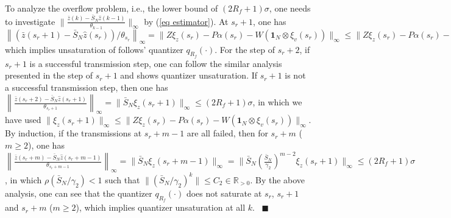 \documentclass{autart}
\def\qedp{\hspace*{\fill}~{\tiny $\blacksquare$}}
\def\qedp{\hspace*{\fill}~{\tiny $\blacksquare$}}
\begin{document}


To analyze the overflow problem, i.e., the lower bound of $(2R_f +1) \sigma$, one needs to investigate $\|\frac{\bar z(k) - \bar S_N \hat z(k-1)}{\theta_{k-1}}\|_\infty$ by (\ref{eq estimator}). At $s_r + 1$, one has 
$
\left\|(\bar z(s_r + 1) - \bar S_N \hat z(s_r))/\theta_{s_r}\right\|_\infty 
=\| Z \xi_z(s_r)  -  P \alpha(s_r)   - W (\mathbf 1_N \otimes \xi_v(s_r)) \|_\infty 
 \le \| Z \xi_z(s_r)  -  P \alpha(s_r)   - W (\mathbf 1_N \otimes \xi_v(s_r)) \|  
\le (2R_f+1)\sigma
$
which implies unsaturation of follows' quantizer $q_{R_f}(\cdot)$. 
For the step of $s_r + 2$, if $s_r+1$ is a successful transmission step, one can follow the similar analysis presented in the step of $s_r + 1$ and shows quantizer unsaturation. If $s_r+1$ is not a successful transmission step, then one has 
$
\left\| \frac{\bar z(s_r + 2) - \bar S_N \hat z(s_r+1)}{\theta_{s_r+1}}\right\|_\infty 
=\| \bar S _N \xi_z (s_r+1) \|_\infty \le (2R_f+1)\sigma
$,
in which we have used $\|\xi_z(s_r + 1 )\|_\infty \le \| Z \xi_z(s_r)  -  P \alpha(s_r)   - W (\mathbf 1_N \otimes \xi_v(s_r)) \|_\infty $. By induction, if the transmissions at $s_r + m-1$ are all failed, then for $s_r + m$ ($m\ge2$), one has 
$
\left\|\frac{\bar z(s_r + m) - \bar S_N \hat z(s_r+m-1)}{\theta_{s_r+m-1}}\right\|_\infty 
=\| \bar S _N \xi_z (s_r + m-1) \|_\infty 
=\| \bar S _N \left(\frac{\bar S_N}{\gamma_2}\right)^{m-2} \xi_z (s_r +1) \|_\infty  \le (2R_f+1)\sigma
$,
in which $\rho( \bar S_N/\gamma_2)< 1$ such that $\|(\bar S_N /\gamma_2)^{k}\| \le C_2 \in \mathbb R _{>0}$. By the above analysis, one can see that the quantizer $q_{R_f}(\cdot)$ does not saturate at $s_r$, $s_r + 1$ and $s_r+m$ ($m\ge 2$), which implies quantizer unsaturation at all $k$.
\qedp
\end{document}
